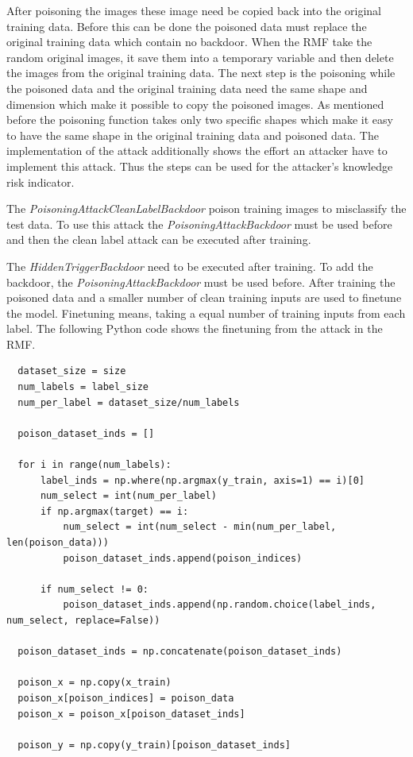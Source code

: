 After poisoning the images these image need be copied back into the original training data. Before this can be done the poisoned data must replace the original training data which contain no backdoor. When the RMF take the random original images, it save them into a temporary variable and then delete the images from the original training data. The next step is the poisoning while the poisoned data and the original training data need the same shape and dimension which make it possible to copy the poisoned images. As mentioned before the poisoning function takes only two specific shapes which make it easy to have the same shape in the original training data and poisoned data. The implementation of the attack additionally shows the effort an attacker have to implement this attack. Thus the steps can be used for the attacker's knowledge risk indicator.

The \textit{PoisoningAttackCleanLabelBackdoor} poison training images to misclassify the test data. To use this attack the \textit{PoisoningAttackBackdoor} must be used before and then the clean label attack can be executed after training.

The \textit{HiddenTriggerBackdoor} need to be executed after training. To add the backdoor, the \textit{PoisoningAttackBackdoor} must be used before. After training the poisoned data and a smaller number of clean training inputs are used to finetune the model. Finetuning means, taking a equal number of training inputs from each label. The following Python code shows the finetuning from the attack in the RMF.

\begin{lstlisting}
  dataset_size = size
  num_labels = label_size
  num_per_label = dataset_size/num_labels

  poison_dataset_inds = []

  for i in range(num_labels):
      label_inds = np.where(np.argmax(y_train, axis=1) == i)[0]
      num_select = int(num_per_label)
      if np.argmax(target) == i:
          num_select = int(num_select - min(num_per_label, len(poison_data)))
          poison_dataset_inds.append(poison_indices)

      if num_select != 0:
          poison_dataset_inds.append(np.random.choice(label_inds, num_select, replace=False))

  poison_dataset_inds = np.concatenate(poison_dataset_inds)

  poison_x = np.copy(x_train)
  poison_x[poison_indices] = poison_data
  poison_x = poison_x[poison_dataset_inds]

  poison_y = np.copy(y_train)[poison_dataset_inds]
\end{lstlisting}

